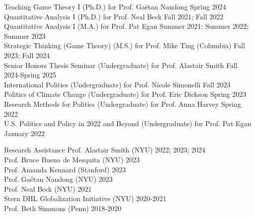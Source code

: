 \documentclass{resume} %
\begin{document}

\begin{rSection}{Teaching}
Game Theory I (Ph.D.) for Prof. Ga\'etan Nandong \hfill Spring 2024\\
Quantitative Analysis I (Ph.D.) for Prof. Neal Beck \hfill Fall 2021; Fall 2022\\
Quantitative Analysis I (M.A.) for Prof. Pat Egan \hfill Summer 2021; Summer 2022; Summer 2023\\
Strategic Thinking (Game Theory) (M.S.) for Prof. Mike Ting (Columbia) \hfill Fall 2023; Fall 2024\\
Senior Honors Thesis Seminar (Undergraduate) for Prof. Alastair Smith \hfill Fall 2024-Spring 2025\\
International Politics (Undergraduate) for Prof. Nicole Simonelli \hfill Fall 2023\\
Politics of Climate Change (Undergraduate) for Prof. Eric Dickson \hfill Spring 2023\\
Research Methods for Politics (Undergraduate) for Prof. Anna Harvey \hfill Spring 2022\\
U.S. Politics and Policy in 2022 and Beyond (Undergraduate) for Prof. Pat Egan \hfill January 2022
\end{rSection}

\begin{rSection}{Research Assistance}
    Prof. Alastair Smith (NYU) \hfill 2022; 2023; 2024\\
    Prof. Bruce Bueno de Mesquita (NYU) \hfill 2023\\
    Prof. Amanda Kennard (Stanford) \hfill 2023\\
    Prof. Ga\'etan Nandong (NYU) \hfill 2023\\
    Prof. Neal Beck (NYU) \hfill 2021\\
    Stern DHL Globalization Initiative (NYU) \hfill 2020-2021\\
    Prof. Beth Simmons (Penn) \hfill 2018-2020
\end{rSection}
\end{document}
